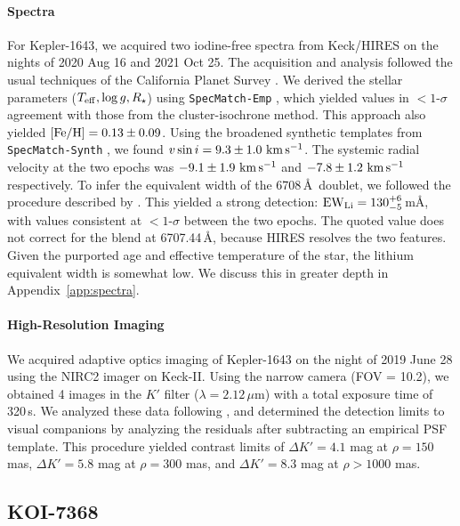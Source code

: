 \documentclass[12pt,twocolumn]{aastex63}
\newcommand{\mkms}{{\rm \,km\,s^{-1}}}  %
\begin{document}
\paragraph{Spectra}
For Kepler-1643, we acquired two iodine-free spectra from Keck/HIRES
on the nights of 2020 Aug 16 and 2021 Oct 25.  The acquisition and
analysis followed the usual techniques of the California Planet Survey
\citep{howard_cps_2010}.  We derived the stellar parameters ($T_{\rm
eff}, \log g, R_\star$) using \texttt{SpecMatch-Emp}
\citep{yee_SM_2017}, which yielded values in $<$$1$-$\sigma$ agreement
with those from the cluster-isochrone method.  This approach also
yielded $[{\rm Fe/H}]=0.13 \pm 0.09$.  Using the broadened synthetic
templates from \texttt{SpecMatch-Synth} \citep{petigura_cksi_2017}, we
found $v\sin i = 9.3 \pm 1.0\,\mkms$.  The systemic radial velocity at
the two epochs was $-9.1 \pm 1.9\,\mkms$ and $-7.8\pm 1.2\,\mkms$
respectively.  To infer the equivalent width of the 
6708\,\AA\ doublet, we followed the procedure described by
\citet{bouma_2021_ngc2516}.  This yielded a strong detection: ${\rm
EW}_{\rm Li} = 130^{+6}_{-5}$\,m\AA, with values consistent at
$<$$1$-$\sigma$ between the two epochs.   The quoted value does not
correct for the  blend at 6707.44\,\AA, because HIRES
resolves the two features.  Given the purported age and effective
temperature of the star, the lithium equivalent width is somewhat low.
We discuss this in greater depth in Appendix~\ref{app:spectra}.

\paragraph{High-Resolution Imaging}
We acquired adaptive optics imaging of Kepler-1643 on the night of
2019 June 28 using the NIRC2 imager on Keck-II.  Using the narrow
camera (FOV = 10.2\arcsec), we obtained 4 images in the $K'$ filter
($\lambda = 2.12\,\mu$m) with a total exposure time of 320\,s. We
analyzed these data following \citet{kraus_impact_2016}, and
determined the detection limits to visual companions by analyzing the
residuals after subtracting an empirical PSF template.  This procedure
yielded contrast limits of $\Delta K' = 4.1$ mag at $\rho = 150$ mas,
$\Delta K' = 5.8$ mag at $\rho = 300$ mas, and $\Delta K' = 8.3$ mag
at $\rho > 1000$ mas.


\subsection{KOI-7368}
\end{document}
